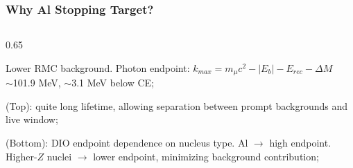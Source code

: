 \documentclass{beamer}
\begin{document}
\begin{frame}
    \frametitle{Why Al Stopping Target?}
    \vspace{-3mm}
\begin{columns}
 \begin{column}{0.65\framewidth}
 \setlength{\leftmargini}{1.1em}

    \begin{itemize}
   {\small     \item Lower RMC background. Photon endpoint: {\footnotesize $k_{max} = m_\mu c^2 - |E_b| - E_{rec} - \Delta M$ }
        \\
        $\sim$101.9 MeV, $\sim$3.1 MeV below CE; 

\item (Top): quite long lifetime, allowing separation between prompt backgrounds and live window; 


\item (Bottom): DIO endpoint dependence on nucleus type. 
Al $\rightarrow$ high endpoint. Higher-$Z$ nuclei $\rightarrow$ lower endpoint, minimizing background contribution;

}
\end{itemize}
\end{column}
\end{columns}
\end{frame}
\end{document}
